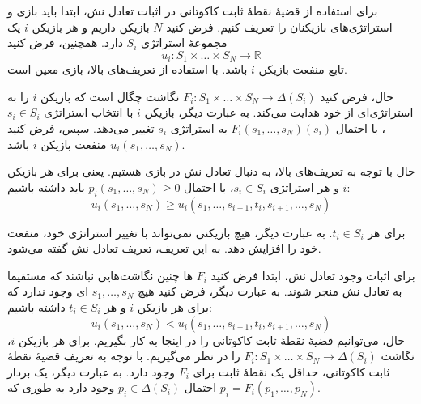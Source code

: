 برای استفاده از قضیهٔ نقطهٔ ثابت کاکوتانی در اثبات تعادل نش، ابتدا باید بازی و استراتژی‌های بازیکنان را تعریف کنیم. فرض کنید $N$ بازیکن داریم و هر بازیکن $i$ یک مجموعهٔ استراتژی $S_i$ دارد. همچنین، فرض کنید
$$u_i : S_1 \times \dots \times S_N \rightarrow \mathbb{R}$$ 
تابع منفعت بازیکن $i$ باشد. با استفاده از تعریف‌های بالا، بازی معین است.

حال، فرض کنید $F_i : S_1 \times \dots \times S_N \rightarrow \Delta(S_i)$ نگاشت چگال است که بازیکن $i$ را به استراتژی‌ای از خود هدایت می‌کند. به عبارت دیگر، بازیکن $i$ با انتخاب استراتژی $s_i \in S_i$، با احتمال $F_i(s_1, \dots, s_N)(s_i)$ به استراتژی $s_i$ تغییر می‌دهد. سپس، فرض کنید $u_i(s_1, \dots, s_N)$ منفعت بازیکن $i$ باشد.

حال با توجه به تعریف‌های بالا، به دنبال تعادل نش در بازی هستیم. یعنی برای هر بازیکن $i$ و هر استراتژی $s_i \in S_i$، با احتمال $p_i(s_1, \dots, s_N) \geq 0$ باید داشته باشیم:
$$u_i(s_1, \dots, s_N) \geq u_i(s_1, \dots, s_{i-1}, t_i, s_{i+1}, \dots, s_N)$$

برای هر $t_i \in S_i$. به عبارت دیگر، هیچ بازیکنی نمی‌تواند با تغییر استراتژی خود، منفعت خود را افزایش دهد. به این تعریف، تعریف تعادل نش گفته می‌شود.

برای اثبات وجود تعادل نش، ابتدا فرض کنید $F_i$ ها چنین نگاشت‌هایی نباشند که مستقیما به تعادل نش منجر شوند. به عبارت دیگر، فرض کنید هیچ $s_1, \dots, s_N$ ای وجود ندارد که برای هر بازیکن $i$ و هر $t_i \in S_i$ داشته باشیم:
$$u_i(s_1, \dots, s_N) < u_i(s_1, \dots, s_{i-1}, t_i, s_{i+1}, \dots, s_N)$$
حال، می‌توانیم قضیهٔ نقطهٔ ثابت کاکوتانی را در اینجا به کار بگیریم. برای هر بازیکن $i$، نگاشت $F_i : S_1 \times \dots \times S_N \rightarrow \Delta(S_i)$ را در نظر می‌گیریم. با توجه به تعریف قضیهٔ نقطهٔ ثابت کاکوتانی، حداقل یک نقطهٔ ثابت برای $F_i$ وجود دارد. به عبارت دیگر، یک بردار احتمال $p_i \in \Delta(S_i)$ وجود دارد به طوری که $p_i = F_i(p_1, \dots, p_N)$.

